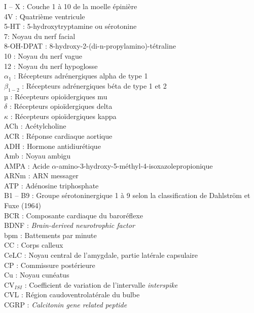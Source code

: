 \documentclass[a4paper,12pt,twoside]{report}
\begin{document}
\begin{singlespacing}

\begin{multicols}{2}
\setlength{\parindent}{-0.5cm}
I – X : Couche 1 à 10 de la moelle épinière\\
4V : Quatrième ventricule\\
5-HT : 5-hydroxytryptamine ou sérotonine\\
7: Noyau du nerf facial\\
8-OH-DPAT : 8-hydroxy-2-(di-n-propylamino)-tétraline\\
10 : Noyau du nerf vague\\
12 : Noyau du nerf hypoglosse\\
$\alpha_{1}$ : Récepteurs adrénergiques alpha de type 1\\
$\beta_{1-2}$ : Récepteurs adrénergiques béta de type 1 et 2\\
µ : Récepteurs opioïdergiques mu\\
$\delta$ : Récepteurs opioïdergiques delta\\
$\kappa$ : Récepteurs opioïdergiques kappa\\
ACh : Acétylcholine\\
ACR : Réponse cardiaque aortique\\
ADH : Hormone antidiurétique\\
Amb : Noyau ambigu\\
AMPA : Acide $\alpha$-amino-3-hydroxy-5-méthyl-4-isoxazolepropionique\\
ARNm : ARN messager\\
ATP : Adénosine triphosphate\\
B1 – B9 : Groupe sérotoninergique 1 à 9 selon la classification de Dahlström et Fuxe (1964)\\
BCR : Composante cardiaque du baroréflexe\\
BDNF : \textit{Brain-derived neurotrophic factor}\\
bpm : Battements par minute\\
CC : Corps calleux\\
CeLC : Noyau central de l’amygdale, partie latérale capsulaire\\
CP : Commissure postérieure\\
Cu : Noyau cunéatus\\
CV$_{ISI}$ : Coefficient de variation de l’intervalle \textit{interspike}\\
CVL : Région caudoventrolatérale du bulbe\\
CGRP : \textit{Calcitonin gene related peptide}\\

\end{multicols}
\end{singlespacing}
\end{document}

